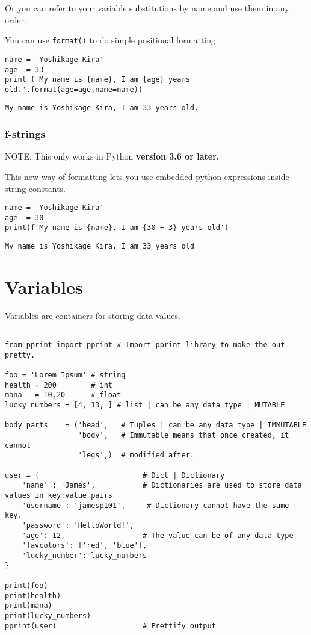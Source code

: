 \documentclass[11pt]{article}
\begin{document}
Or you can refer to your variable substitutions by name and use them in any order.

You can use \texttt{format()} to do simple positional formatting
\begin{verbatim}
name = 'Yoshikage Kira'
age  = 33
print ('My name is {name}, I am {age} years old.'.format(age=age,name=name))
\end{verbatim}

\begin{verbatim}
My name is Yoshikage Kira, I am 33 years old.
\end{verbatim}

\subsubsection{f-strings}
\label{sec:orgf7457e7}
NOTE: This only works in Python \textbf{version 3.6 or later.}

This new way of formatting lets you use embedded python expressions inside string constants.

\begin{verbatim}
name = 'Yoshikage Kira'
age  = 30
print(f'My name is {name}. I am {30 + 3} years old')
\end{verbatim}

\begin{verbatim}
My name is Yoshikage Kira. I am 33 years old
\end{verbatim}

\section{Variables}
\label{sec:org2fb2131}
Variables are containers for storing data values.
\begin{verbatim}

from pprint import pprint # Import pprint library to make the out pretty.

foo = 'Lorem Ipsum' # string
health = 200        # int
mana   = 10.20      # float
lucky_numbers = [4, 13, ] # list | can be any data type | MUTABLE

body_parts    = ('head',   # Tuples | can be any data type | IMMUTABLE
                 'body',   # Immutable means that once created, it cannot
                 'legs',)  # modified after.

user = {                        # Dict | Dictionary
    'name' : 'James',           # Dictionaries are used to store data values in key:value pairs
    'username': 'jamesp101',     # Dictionary cannot have the same key.
    'password': 'HelloWorld!',
    'age': 12,                  # The value can be of any data type
    'favcolors': ['red', 'blue'],
    'lucky_number': lucky_numbers
}

print(foo)
print(health)
print(mana)
print(lucky_numbers)
pprint(user)                    # Prettify output 
\end{verbatim}
\end{document}
